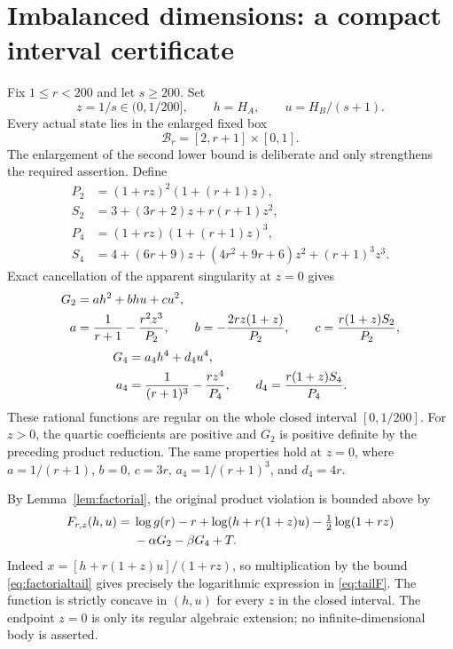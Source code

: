 \documentclass[11pt]{article}
\theoremstyle{remark}
\begin{document}
\section{Imbalanced dimensions: a compact interval certificate}\label{sec:tail}

Fix $1\le r<200$ and let $s\ge200$. Set
\[
 z=1/s\in(0,1/200],\qquad h=H_A,\qquad u=H_B/(s+1).
\]
Every actual state lies in the enlarged fixed box
\[
 \mathcal B_r=[2,r+1]\times[0,1].
\]
The enlargement of the second lower bound is deliberate and only strengthens the required assertion. Define
\begin{align*}
 P_2&=(1+rz)^2(1+(r+1)z),\\
 S_2&=3+(3r+2)z+r(r+1)z^2,\\
 P_4&=(1+rz)(1+(r+1)z)^3,\\
 S_4&=4+(6r+9)z+(4r^2+9r+6)z^2+(r+1)^3z^3.
\end{align*}
Exact cancellation of the apparent singularity at $z=0$ gives
\begin{align}\label{eq:tailquad}
 G_2&=ah^2+bhu+cu^2,\notag\\
 a&=\frac1{r+1}-\frac{r^2z^3}{P_2},\qquad
 b=-\frac{2rz(1+z)}{P_2},\qquad
 c=\frac{r(1+z)S_2}{P_2},
\end{align}
\begin{align}\label{eq:tailquartic}
 G_4&=a_4h^4+d_4u^4,\notag\\
 a_4&=\frac1{(r+1)^3}-\frac{rz^4}{P_4},\qquad
 d_4=\frac{r(1+z)S_4}{P_4}.
\end{align}
These rational functions are regular on the whole closed interval $[0,1/200]$. For $z>0$, the quartic coefficients are positive and $G_2$ is positive definite by the preceding product reduction. The same properties hold at $z=0$, where $a=1/(r+1)$, $b=0$, $c=3r$, $a_4=1/(r+1)^3$, and $d_4=4r$.

By Lemma~\ref{lem:factorial}, the original product violation is bounded above by
\begin{align}\label{eq:tailF}
 F_{r,z}(h,u)={}&\log g(r)-r+
 \log(h+r(1+z)u)-\tfrac12\log(1+rz)\notag\\
 &-\alpha G_2-\beta G_4+T.
\end{align}
Indeed $x=[h+r(1+z)u]/(1+rz)$, so multiplication by the bound \eqref{eq:factorialtail} gives precisely the logarithmic expression in \eqref{eq:tailF}. The function is strictly concave in $(h,u)$ for every $z$ in the closed interval. The endpoint $z=0$ is only its regular algebraic extension; no infinite-dimensional body is asserted.
\end{document}
